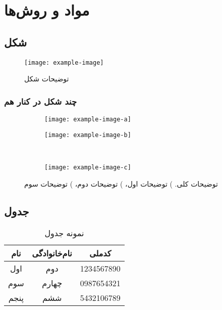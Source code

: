\chapter{مواد و روش‌ها}
\section{شکل}
\begin{figure}[!htb]
	\centering
	\texttt{[image: example-image]}
	\caption{توضیحات شکل}
	\label{fig:test}
\end{figure}

\subsection{چند شکل در کنار هم}
\begin{figure}[!htb]
	\centering
	\begin{subfigure}{.2\linewidth}
		\centering
		\texttt{[image: example-image-a]}
		\caption{}
		\label{subfig:exam1}
	\end{subfigure}
	\hspace{0.5cm}
	\begin{subfigure}{.2\linewidth}
		\centering
		\texttt{[image: example-image-b]}
		\caption{}
		\label{subfig:exam2}
	\end{subfigure}\\
	\begin{subfigure}{.2\linewidth}
		\centering
		\texttt{[image: example-image-c]}
		\caption{}
		\label{subfig:exam3}
	\end{subfigure}
	\caption[توضیحات کلی]{توضیحات کلی.
		)
		توضیحات اول،
		)
		توضیحات دوم،
		)
		توضیحات سوم}
	\label{fig:subfig}
\end{figure}

\section{جدول}
\begin{table}[!htb]
	\centering
	\caption{نمونه جدول}
	\label{tab:test}
	\begin{tabular}{ccc}
		\toprule
		نام & نام‌خانوادگی & کدملی
		\\\midrule
		اول & دوم & 1234567890
		\\
		سوم & چهارم & 0987654321
		\\
		پنجم & ششم & 5432106789
		\\\bottomrule
	\end{tabular}
\end{table}


